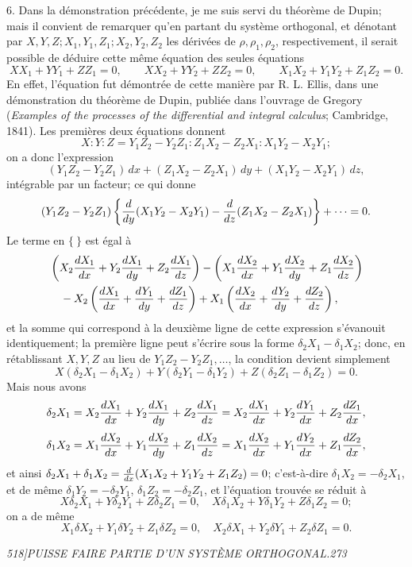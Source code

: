\documentclass[11pt]{article}
\newcommand{\phead}[3]{\noindent\textit{#1\hfill #2\hfill #3}\par\medskip}
\newcommand{\D}{\delta}
\begin{document}
6. Dans la d\'emonstration pr\'ec\'edente, je me suis servi du th\'eor\`eme de Dupin; mais il
convient de remarquer qu'en partant du syst\`eme orthogonal, et d\'enotant par
$X,Y,Z; X_1,Y_1,Z_1; X_2,Y_2,Z_2$ les d\'eriv\'ees de $\rho,\rho_1,\rho_2$, respectivement,
il serait possible de d\'eduire cette m\^eme \'equation des seules \'equations
\[
XX_1+YY_1+ZZ_1=0,\qquad
XX_2+YY_2+ZZ_2=0,\qquad
X_1X_2+Y_1Y_2+Z_1Z_2=0.
\]
En effet, l'\'equation fut d\'emontr\'ee de cette mani\`ere par R. L. Ellis, dans une
d\'emonstration du th\'eor\`eme de Dupin, publi\'ee dans l'ouvrage de Gregory
(\textit{Examples of the processes of the differential and integral calculus}; Cambridge, 1841).
Les premi\`eres deux \'equations donnent
\[
X:Y:Z=Y_1Z_2-Y_2Z_1:Z_1X_2-Z_2X_1:X_1Y_2-X_2Y_1;
\]
on a donc l'expression
\[
(Y_1Z_2-Y_2Z_1)\,dx+(Z_1X_2-Z_2X_1)\,dy+(X_1Y_2-X_2Y_1)\,dz,
\]
int\'egrable par un facteur; ce qui donne
\[
(Y_1Z_2-Y_2Z_1)\left\{
{d\over dy}(X_1Y_2-X_2Y_1)-{d\over dz}(Z_1X_2-Z_2X_1)\right\}+\cdots=0.
\]
Le terme en $\{\ \}$ est \'egal \`a
\[
\begin{split}
&\left(X_2{dX_1\over dx}+Y_2{dX_1\over dy}+Z_2{dX_1\over dz}\right)
-\left(X_1{dX_2\over dx}+Y_1{dX_2\over dy}+Z_1{dX_2\over dz}\right)\\
&\quad -X_2\left({dX_1\over dx}+{dY_1\over dy}+{dZ_1\over dz}\right)
+X_1\left({dX_2\over dx}+{dY_2\over dy}+{dZ_2\over dz}\right),
\end{split}
\]
et la somme qui correspond \`a la deuxi\`eme ligne de cette expression s'\'evanouit
identiquement; la premi\`ere ligne peut s'\'ecrire sous la forme
$\D_2X_1-\D_1X_2$; donc, en r\'etablissant $X,Y,Z$ au lieu de
$Y_1Z_2-Y_2Z_1,\ldots$, la condition devient simplement
\[
X(\D_2X_1-\D_1X_2)+Y(\D_2Y_1-\D_1Y_2)+Z(\D_2Z_1-\D_1Z_2)=0.
\]
Mais nous avons
\[
\D_2X_1=X_2{dX_1\over dx}+Y_2{dX_1\over dy}+Z_2{dX_1\over dz}
=X_2{dX_1\over dx}+Y_2{dY_1\over dx}+Z_2{dZ_1\over dx},
\]
\[
\D_1X_2=X_1{dX_2\over dx}+Y_1{dX_2\over dy}+Z_1{dX_2\over dz}
=X_1{dX_2\over dx}+Y_1{dY_2\over dx}+Z_1{dZ_2\over dx},
\]
et ainsi $\D_2X_1+\D_1X_2={d\over dx}(X_1X_2+Y_1Y_2+Z_1Z_2)=0$; c'est-\`a-dire
$\D_1X_2=-\D_2X_1$, et de m\^eme $\D_1Y_2=-\D_2Y_1$, $\D_1Z_2=-\D_2Z_1$, et l'\'equation
trouv\'ee se r\'eduit \`a
\[
X\D_2X_1+Y\D_2Y_1+Z\D_2Z_1=0,\quad
X\D_1X_2+Y\D_1Y_2+Z\D_1Z_2=0;
\]
on a de m\^eme
\[
X_1\D X_2+Y_1\D Y_2+Z_1\D Z_2=0,\quad
X_2\D X_1+Y_2\D Y_1+Z_2\D Z_1=0.
\]

\clearpage

\phead{518]}{PUISSE FAIRE PARTIE D'UN SYST\`EME ORTHOGONAL.}{273}
\end{document}
